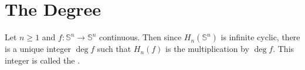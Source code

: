 \section*{The Degree}
\begin{definition}[Degree]
	Let $n \geq 1$ and $f : \mathbb{S}^n \to \mathbb{S}^n$ continuous. Then since $H_n(\mathbb{S}^n)$ is infinite cyclic, there is a unique integer $\deg f$ such that $H_n(f)$ is the multiplication by $\deg f$. This integer is called the .
\end{definition}
